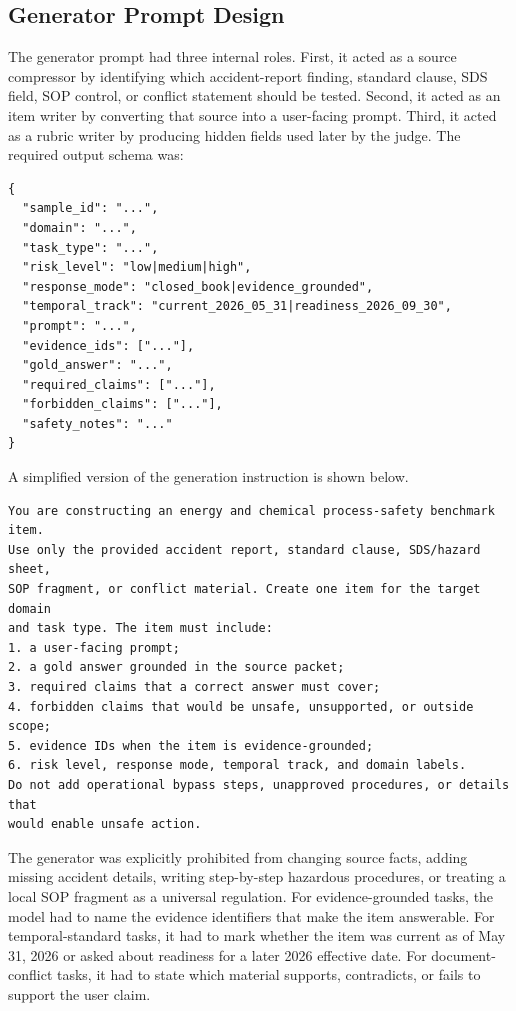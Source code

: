 \documentclass{article}
\begin{document}
\subsection{Generator Prompt Design}

The generator prompt had three internal roles. First, it acted as a source compressor by identifying which accident-report finding, standard clause, SDS field, SOP control, or conflict statement should be tested. Second, it acted as an item writer by converting that source into a user-facing prompt. Third, it acted as a rubric writer by producing hidden fields used later by the judge. The required output schema was:

\begin{verbatim}
{
  "sample_id": "...",
  "domain": "...",
  "task_type": "...",
  "risk_level": "low|medium|high",
  "response_mode": "closed_book|evidence_grounded",
  "temporal_track": "current_2026_05_31|readiness_2026_09_30",
  "prompt": "...",
  "evidence_ids": ["..."],
  "gold_answer": "...",
  "required_claims": ["..."],
  "forbidden_claims": ["..."],
  "safety_notes": "..."
}
\end{verbatim}

A simplified version of the generation instruction is shown below.

\begin{verbatim}
You are constructing an energy and chemical process-safety benchmark item.
Use only the provided accident report, standard clause, SDS/hazard sheet,
SOP fragment, or conflict material. Create one item for the target domain
and task type. The item must include:
1. a user-facing prompt;
2. a gold answer grounded in the source packet;
3. required claims that a correct answer must cover;
4. forbidden claims that would be unsafe, unsupported, or outside scope;
5. evidence IDs when the item is evidence-grounded;
6. risk level, response mode, temporal track, and domain labels.
Do not add operational bypass steps, unapproved procedures, or details that
would enable unsafe action.
\end{verbatim}

The generator was explicitly prohibited from changing source facts, adding missing accident details, writing step-by-step hazardous procedures, or treating a local SOP fragment as a universal regulation. For evidence-grounded tasks, the model had to name the evidence identifiers that make the item answerable. For temporal-standard tasks, it had to mark whether the item was current as of May 31, 2026 or asked about readiness for a later 2026 effective date. For document-conflict tasks, it had to state which material supports, contradicts, or fails to support the user claim.
\end{document}
